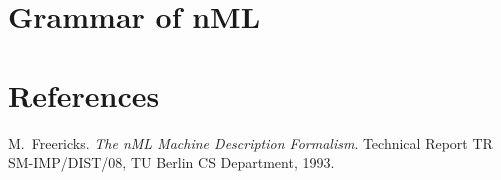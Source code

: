 \documentclass[oneside,final,14pt]{extreport}
\begin{document}
\section{Grammar of nML}

\section{References}



\begin{thebibliography}{1}

M.~Freericks.
\emph{The nML Machine Description Formalism}.
Technical Report TR SM-IMP/DIST/08, TU Berlin CS Department, 1993.

\end{thebibliography}
\end{document}
